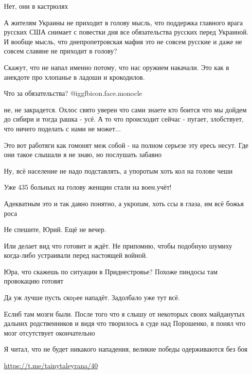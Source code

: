 \begin{multicols}{2}
Нет, они в кастрюлях


А жителям Украины не приходит в голову мысль, что поддержка главного врага
русских США снимает с повестки дня все обязательства русских перед Украиной. И
вообще мысль, что днепропетровская мафия это не совсем русские и даже не совсем
славяне не приходит в голову?


Скажут, что не напал именно потому, что нас оружием накачали. Это как в
анекдоте про хлопанье в ладоши и крокодилов.


Что за обязательства?  @igg{fbicon.face.monocle} 


не, не закрадется. Охлос свято уверен что сами знаете кто боится что мы дойдем
до сибири и тогда рашка - усё. А то что происходит сейчас - пугает, злобствует,
что ничего поделать с нами не может... 

Это вот работяги как гомонят меж собой - на полном серьезе эту ересь несут. Где
они такое слышали я не знаю, но послушать забавно


Ну, всё население не надо подставлять, а упоротым хоть кол на голове чеши


Уже 435 больных на голову женщин стали на воен.учёт!


Адекватным это и так давно понятно, а укропам, хоть ссы в глаза, им всё божья роса


Не спешите, Юрий. Ещё не вечер.


Или делает вид что готовит и ждёт. Не припомню, чтобы подобную шумиху
когда-либо устраивали перед настоящей войной.


Юра, что скажешь по ситуации в Приднестровье? Похоже пиндосы там провокацию готовят


Да уж лучше пусть скоpее нападёт. Задолбало уже тут всё.


Еслиб там мозги были. После того что я слышу от некоторых своих майданутых
дальних родственников и видя что творилось в суде над Порошенко, я понял что
мозг отсутствует окончательно


Я читал, что не будет никакого нападения, великие победы одерживаются без боя

\url{https://t.me/tainytaleyrana/40}

\end{multicols} %
